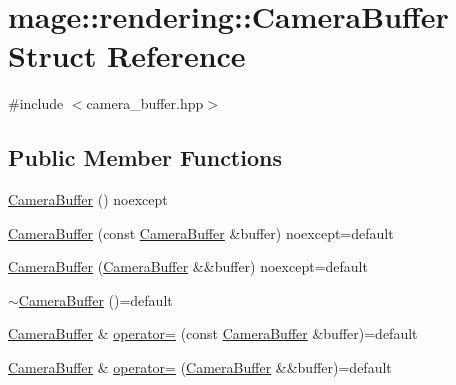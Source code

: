 \hypertarget{structmage_1_1rendering_1_1_camera_buffer}{}\section{mage\+:\+:rendering\+:\+:Camera\+Buffer Struct Reference}
\label{structmage_1_1rendering_1_1_camera_buffer}


{\ttfamily \#include $<$camera\+\_\+buffer.\+hpp$>$}

\subsection*{Public Member Functions}
\begin{DoxyCompactItemize}
\item 
\hyperlink{structmage_1_1rendering_1_1_camera_buffer_a751c2923a5deb710d7c3957f04c89fcf}{Camera\+Buffer} () noexcept
\item 
\hyperlink{structmage_1_1rendering_1_1_camera_buffer_a08ff60a4695d723218c5cffb4b95cc59}{Camera\+Buffer} (const \hyperlink{structmage_1_1rendering_1_1_camera_buffer}{Camera\+Buffer} \&buffer) noexcept=default
\item 
\hyperlink{structmage_1_1rendering_1_1_camera_buffer_a16f0d0938bb4e4174461c3a8c8ad3e20}{Camera\+Buffer} (\hyperlink{structmage_1_1rendering_1_1_camera_buffer}{Camera\+Buffer} \&\&buffer) noexcept=default
\item 
\hyperlink{structmage_1_1rendering_1_1_camera_buffer_aadd09f0ddad88a8463e8dda3ae4e3849}{$\sim$\+Camera\+Buffer} ()=default
\item 
\hyperlink{structmage_1_1rendering_1_1_camera_buffer}{Camera\+Buffer} \& \hyperlink{structmage_1_1rendering_1_1_camera_buffer_a5c0b3a1e054ebcb4597f313c0346da57}{operator=} (const \hyperlink{structmage_1_1rendering_1_1_camera_buffer}{Camera\+Buffer} \&buffer)=default
\item 
\hyperlink{structmage_1_1rendering_1_1_camera_buffer}{Camera\+Buffer} \& \hyperlink{structmage_1_1rendering_1_1_camera_buffer_a12658ff989daac2e910b91633ac0223d}{operator=} (\hyperlink{structmage_1_1rendering_1_1_camera_buffer}{Camera\+Buffer} \&\&buffer)=default
\end{DoxyCompactItemize}
